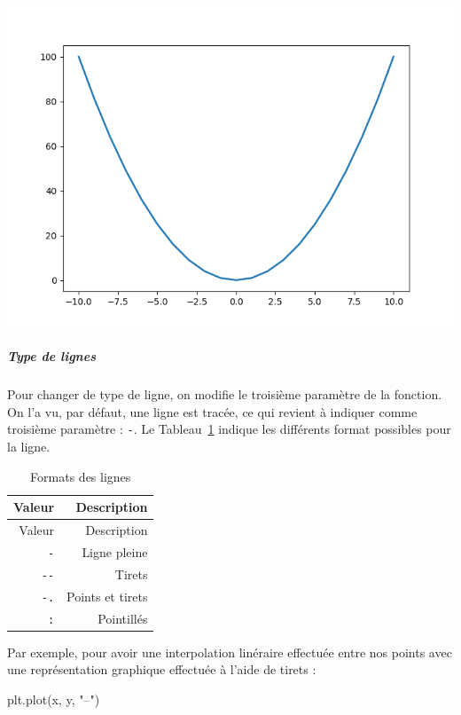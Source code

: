 \documentclass[12pt,]{book}
\newenvironment{Shaded}{\begin{snugshade}}{\end{snugshade}}
\newcommand{\StringTok}[1]{\textcolor[rgb]{0.31,0.60,0.02}{#1}}
\newcommand{\NormalTok}[1]{#1}
\let\oldsubparagraph\subparagraph
\renewcommand{\subparagraph}[1]{\oldsubparagraph{#1}\mbox{}}
\numberwithin{equation}{section}
\numberwithin{countremarque}{section}
\begin{document}
\begin{center}\includegraphics[width=9.03in]{figs/pyplot/lignes_epaisseur} \end{center}

\subparagraph{Type de lignes}\label{type-de-lignes}

Pour changer de type de ligne, on modifie le troisième paramètre de la
fonction. On l'a vu, par défaut, une ligne est tracée, ce qui revient à
indiquer comme troisième paramètre :
\texttt{\textquotesingle{}-\textquotesingle{}}. Le
Tableau~\ref{tab:fmt-lignes} indique les différents format possibles
pour la ligne.

\begin{longtable}[]{@{}rr@{}}
\caption{\label{tab:fmt-lignes} Formats des lignes}\tabularnewline
\toprule
Valeur & Description\tabularnewline
\midrule
\endfirsthead
\toprule
Valeur & Description\tabularnewline
\midrule
\endhead
\texttt{-} & Ligne pleine\tabularnewline
\texttt{-\/-} & Tirets\tabularnewline
\texttt{-.} & Points et tirets\tabularnewline
\texttt{:} & Pointillés\tabularnewline
\bottomrule
\end{longtable}

Par exemple, pour avoir une interpolation linéraire effectuée entre nos
points avec une représentation graphique effectuée à l'aide de tirets :

\begin{Shaded}
\begin{Highlighting}[]
\NormalTok{plt.plot(x, y, }\StringTok{"--"}\NormalTok{)}
\end{Highlighting}
\end{Shaded}
\end{document}
